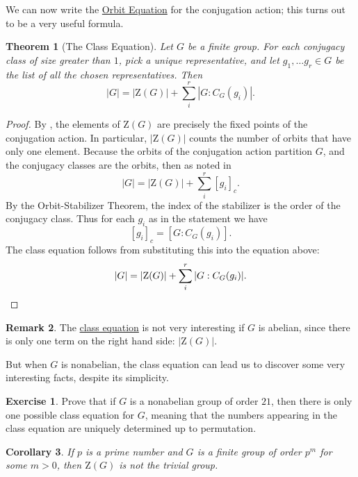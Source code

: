 \documentclass[12pt]{report}
\newtheorem{theorem}{Theorem}[chapter]
\newtheorem{corollary}[theorem]{Corollary}
\numberwithin{equation}{section}
\numberwithin{theorem}{chapter}
\theoremstyle{definition}
\newtheorem{exercise}{Exercise}
\newtheorem*{basic properties}{Basic Properties}
\newtheorem*{Important Remark}{Important Remark}
\newtheorem{remark}[theorem]{Remark}
\begin{document}
We can now write the \hyperref[Orbit Equation]{Orbit Equation} for the conjugation action; this turns out to be a very useful formula.

\begin{theorem}[The Class Equation]\label{class equation}
Let $G$ be a finite group. For each conjugacy class of size greater than $1$, pick a unique representative, and let $g_1,\ldots g_r \in G$ be the list of all the chosen representatives. Then 
$$|G| = |\mathrm{Z}(G)| + \sum_i^r |G : C_G(g_i)|.$$
\end{theorem}

\begin{proof}
 By , the elements of $\mathrm{Z}(G)$ are precisely the fixed points of the conjugation action. In particular, $|\mathrm{Z}(G)|$ counts the number of orbits that have only one element. Because the orbits of the conjugation action partition $G$, and the conjugacy classes are the orbits, then as noted in 
$$|G| = |\mathrm{Z}(G)| + \sum_i^r [g_i]_c.$$
By the Orbit-Stabilizer Theorem, the index of the stabilizer is the order of the conjugacy class. Thus for each $g_i$ as in the statement we have 
$$[g_i]_c = [G: C_G(g_i)].$$ 
The class equation follows from substituting this into the equation above:
$$|G| = |\mathrm{Z}(G)| + \sum_i^r |G : C_G(g_i)|.\qedhere$$
\end{proof}



\begin{remark}
	The \hyperref[Class Equation]{class equation} is not very interesting if $G$ is abelian, since there is only one term on the right hand side: $|\mathrm{Z}(G)|$.
\end{remark}

But when $G$ is nonabelian, the class equation can lead us to discover some very interesting facts, despite its simplicity.

\begin{exercise}
Prove that if $G$ is a nonabelian group of order $21$, then there is only one possible class equation for $G$, meaning that the numbers appearing in the class equation are uniquely determined up to permutation.
\end{exercise}



\begin{corollary}
If $p$ is a prime number and $G$ is a finite group of order $p^m$ for some $m > 0$, then $\mathrm{Z}(G)$ is not the trivial group.
\end{corollary}
\end{document}
